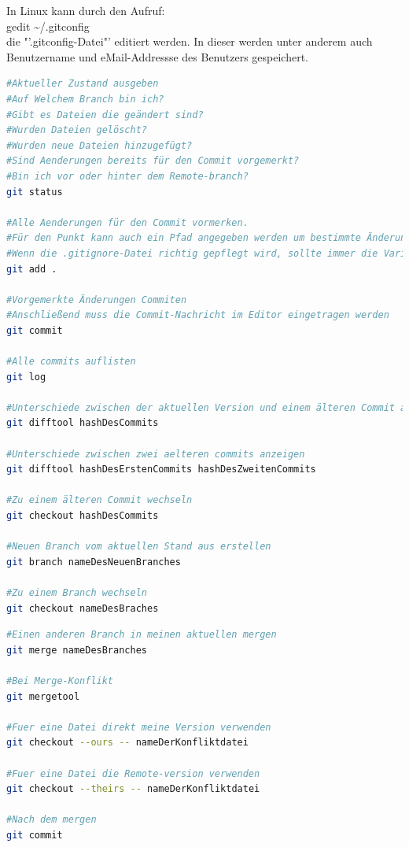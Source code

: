 
In Linux kann durch den Aufruf:\\
gedit \textasciitilde /.gitconfig\\
die "'.gitconfig-Datei"' editiert werden. In dieser werden unter anderem auch Benutzername und eMail-Addressse des Benutzers gespeichert.
\nsecend

\begin{lstlisting}[language=bash]
#Aktueller Zustand ausgeben
#Auf Welchem Branch bin ich?
#Gibt es Dateien die geändert sind? 
#Wurden Dateien gelöscht? 
#Wurden neue Dateien hinzugefügt?
#Sind Aenderungen bereits für den Commit vorgemerkt?
#Bin ich vor oder hinter dem Remote-branch?
git status

#Alle Aenderungen für den Commit vormerken.
#Für den Punkt kann auch ein Pfad angegeben werden um bestimmte Änderungen vorzumerken.
#Wenn die .gitignore-Datei richtig gepflegt wird, sollte immer die Variante mit dem Punkt verwendet werden können.
git add .

#Vorgemerkte Änderungen Commiten
#Anschließend muss die Commit-Nachricht im Editor eingetragen werden
git commit

#Alle commits auflisten
git log

#Unterschiede zwischen der aktuellen Version und einem älteren Commit anzeigen
git difftool hashDesCommits

#Unterschiede zwischen zwei aelteren commits anzeigen
git difftool hashDesErstenCommits hashDesZweitenCommits

#Zu einem älteren Commit wechseln
git checkout hashDesCommits

#Neuen Branch vom aktuellen Stand aus erstellen
git branch nameDesNeuenBranches

#Zu einem Branch wechseln
git checkout nameDesBraches

\end{lstlisting}
\nsecend

\begin{lstlisting}[language=bash]
#Einen anderen Branch in meinen aktuellen mergen
git merge nameDesBranches

#Bei Merge-Konflikt
git mergetool

#Fuer eine Datei direkt meine Version verwenden 
git checkout --ours -- nameDerKonfliktdatei

#Fuer eine Datei die Remote-version verwenden
git checkout --theirs -- nameDerKonfliktdatei

#Nach dem mergen
git commit
\end{lstlisting}
\nsecend

